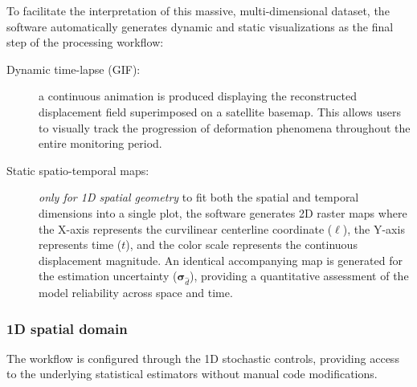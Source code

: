 To facilitate the interpretation of this massive, multi-dimensional dataset, the software automatically generates dynamic and static visualizations as the final step of the processing workflow:
\begin{description}
    \item[Dynamic time-lapse (GIF):] a continuous animation is produced displaying the reconstructed displacement field superimposed on a satellite basemap. This allows users to visually track the progression of deformation phenomena throughout the entire monitoring period.
    \item[Static spatio-temporal maps:] \textit{only for 1D spatial geometry} to fit both the spatial and temporal dimensions into a single plot, the software generates 2D raster maps where the X-axis represents the curvilinear centerline coordinate ($\ell$), the Y-axis represents time ($t$), and the color scale represents the continuous displacement magnitude. An identical accompanying map is generated for the estimation uncertainty ($\boldsymbol{\sigma}_{\hat{d}}$), providing a quantitative assessment of the model reliability across space and time.
\end{description}


\subsubsection{1D spatial domain}
The workflow is configured through the 1D stochastic controls, providing access to the underlying statistical estimators without manual code modifications.

